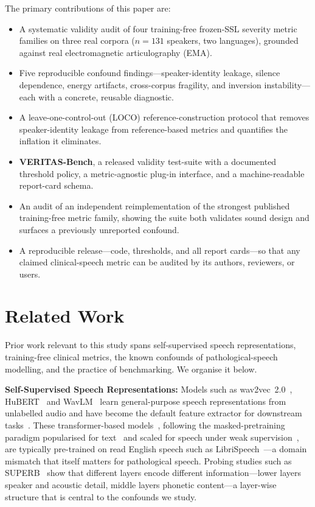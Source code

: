 \documentclass[runningheads]{llncs}
\begin{document}
The primary contributions of this paper are:
\begin{itemize}
\item A systematic validity audit of four training-free frozen-SSL severity
metric families on three real corpora ($n{=}131$ speakers, two languages),
grounded against real electromagnetic articulography (EMA).
\item Five reproducible confound findings---speaker-identity leakage, silence
dependence, energy artifacts, cross-corpus fragility, and inversion
instability---each with a concrete, reusable diagnostic.
\item A leave-one-control-out (LOCO) reference-construction protocol that removes
speaker-identity leakage from reference-based metrics and quantifies the inflation
it eliminates.
\item \textbf{VERITAS-Bench}, a released validity test-suite with a documented
threshold policy, a metric-agnostic plug-in interface, and a machine-readable
report-card schema.
\item An audit of an independent reimplementation of the strongest published
training-free metric family, showing the suite both validates sound design and
surfaces a previously unreported confound.
\item A reproducible release---code, thresholds, and all report cards---so that
any claimed clinical-speech metric can be audited by its authors, reviewers, or
users.
\end{itemize}

\section{Related Work}
Prior work relevant to this study spans self-supervised speech representations,
training-free clinical metrics, the known confounds of pathological-speech
modelling, and the practice of benchmarking. We organise it below.

\textbf{Self-Supervised Speech Representations:} Models such as
wav2vec~2.0~\cite{baevski2020wav2vec2}, HuBERT~\cite{hsu2021hubert} and
WavLM~\cite{chen2022wavlm} learn general-purpose speech representations from
unlabelled audio and have become the default feature extractor for downstream
tasks~\cite{mohamed2022review}. These transformer-based
models~\cite{vaswani2017attention}, following the masked-pretraining paradigm
popularised for text~\cite{devlin2019bert} and scaled for speech under weak
supervision~\cite{radford2023whisper}, are typically pre-trained on read English
speech such as LibriSpeech~\cite{panayotov2015librispeech}---a domain mismatch
that itself matters for pathological speech. Probing studies such as
SUPERB~\cite{yang2021superb}
show that different layers encode different information---lower layers speaker and
acoustic detail, middle layers phonetic content---a layer-wise structure that is
central to the confounds we study.
\end{document}
